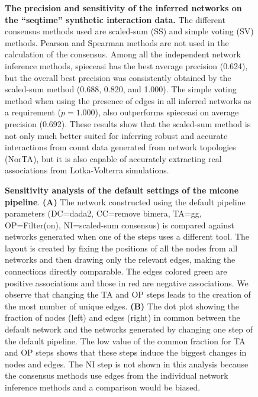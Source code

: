 \documentclass[letterpaper,12pt]{article}
\begin{document}
  \begin{figure}[H]
    \centering
      \caption{
        \textbf{The precision and sensitivity of the inferred networks on the ``seqtime'' synthetic interaction data.}
        The different consensus methods used are scaled-sum (SS) and simple voting (SV) methods.
        Pearson and Spearman methods are not used in the calculation of the consensus.
        Among all the independent network inference methods, \acs{spieceasi} has the best average precision (0.624), but the overall best precision was consistently obtained by the scaled-sum method (0.688, 0.820, and 1.000).
        The simple voting method when using the presence of edges in all inferred networks as a requirement ($p = 1.000$), also outperforms \acs{spieceasi} on average precision (0.692).
        These results show that the scaled-sum method is not only much better suited for inferring robust and accurate interactions from count data generated from network topologies (NorTA), but it is also capable of accurately extracting real associations from Lotka-Volterra simulations.
      }
    \label{fig:figure_s6}
  \end{figure}

  \begin{figure}[H]
    \centering
    \caption{
      \textbf{Sensitivity analysis of the default settings of the \ac{micone} pipeline}.
      \textbf{(A)} The network constructed using the default pipeline parameters (DC=\ac{dada2}, CC=remove bimera, TA=\ac{gg}, OP=Filter(on), NI=scaled-sum consensus) is compared against networks generated when one of the steps uses a different tool.
      The layout is created by fixing the positions of all the nodes from all networks and then drawing only the relevant edges, making the connections directly comparable.
      The edges colored green are positive associations and those in red are negative associations.
      We observe that changing the TA and OP steps leads to the creation of the most number of unique edges.
      \textbf{(B)} The dot plot showing the fraction of nodes (left) and edges (right) in common between the default network and the networks generated by changing one step of the default pipeline.
      The low value of the common fraction for TA and OP steps shows that these steps induce the biggest changes in nodes and edges.
      The NI step is not shown in this analysis because the consensus methods use edges from the individual network inference methods and a comparison would be biased.
    }
    \label{fig:figure_s7}
  \end{figure}
\end{document}
